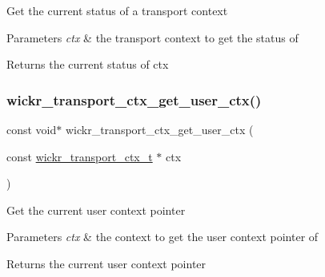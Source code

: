 Get the current status of a transport context


\begin{DoxyParams}{Parameters}
{\em ctx} & the transport context to get the status of \\
\hline
\end{DoxyParams}
\begin{DoxyReturn}{Returns}
the current status of \textquotesingle{}ctx\textquotesingle{} 
\end{DoxyReturn}
\mbox{\label{group__wickr__transport__ctx_gaea14ff3de739f7bf4f85516fdefd1ea9}} 
\subsubsection{\texorpdfstring{wickr\+\_\+transport\+\_\+ctx\+\_\+get\+\_\+user\+\_\+ctx()}{wickr\_transport\_ctx\_get\_user\_ctx()}}
{\footnotesize\ttfamily const void$\ast$ wickr\+\_\+transport\+\_\+ctx\+\_\+get\+\_\+user\+\_\+ctx (\begin{DoxyParamCaption}\item[{const \hyperlink{structwickr__transport__ctx}{wickr\+\_\+transport\+\_\+ctx\+\_\+t} $\ast$}]{ctx }\end{DoxyParamCaption})}

Get the current user context pointer


\begin{DoxyParams}{Parameters}
{\em ctx} & the context to get the user context pointer of \\
\hline
\end{DoxyParams}
\begin{DoxyReturn}{Returns}
the current user context pointer 
\end{DoxyReturn}
\mbox{\label{group__wickr__transport__ctx_gabd4c671c3f420e804dae16c662bc71c7}} 
